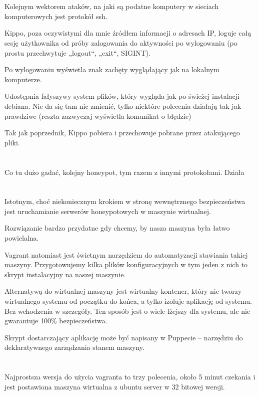 \documentclass[runningheads,a4paper]{llncs}
\begin{document}
\section{}
Kolejnym wektorem ataków, na jaki są podatne komputery w sieciach komputerowych jest protokół ssh.

Kippo, poza oczywistymi dla mnie źródłem informacji o adresach IP, loguje całą sesję użytkownika od próby zalogowania do aktywności po wylogowaniu (po prostu przechwytuje „logout“, „exit“, SIGINT).

Po wylogowaniu wyświetla znak zachęty wyglądający jak na lokalnym komputerze.

Udostępnia fałyszywy system plików, który wygląda jak po świeżej instalacji debiana. Nie da się tam nic zmienić, tylko niektóre polecenia działają tak jak prawdziwe (reszta zazwyczaj wyświetla komunikat o błędzie)

Tak jak poprzednik, Kippo pobiera i przechowuje pobrane przez atakującego pliki.
\section{}
Co tu dużo gadać, kolejny honeypot, tym razem z innymi protokołami. Działa
\section{}
Istotnym, choć niekoniecznym krokiem w stronę wewnętrznego bezpieczeństwa jest uruchamianie serwerów honeypotowych w maszynie wirtualnej.

Rozwiązanie bardzo przydatne gdy chcemy, by nasza maszyna była łatwo powielalna.

Vagrant natomiast jest świetnym narzędziem do automatyzacji stawiania takiej maszyny. Przygotowujemy kilka plików konfiguracyjnych w tym jeden z nich to skrypt instalacyjny na naszej maszynie.

Alternatywą do wirtualnej maszyny jest wirtualny kontener, który nie tworzy wirtualnego systemu od początku do końca, a tylko izoluje aplikację od systemu. Bez wchodzenia w szczegóły. Ten sposób jest o wiele lżejszy dla systemu, ale nie gwarantuje 100\% bezpieczeństwa.

Skrypt dostarczający aplikację może być napisany w Puppecie – narzędziu do deklaratywnego zarządzania stanem maszyny.
\section{}
Najprostsza wersja do użycia vagranta to trzy polecenia, około 5 minut czekania i jest postawiona maszyna wirtualna z ubuntu server w 32 bitowej wersji.
\end{document}
